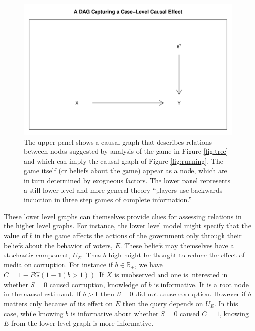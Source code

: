 \documentclass[12pt,]{book}
\begin{document}
\begin{figure}

{\centering \includegraphics[width=\textwidth]{ii_files/figure-latex/unnamed-chunk-13-1} 

}

\caption{\label{fig:gamedag} The upper panel shows a causal graph that describes  relations between nodes suggested by analysis of  the  game  in Figure \ref{fig:tree} and which can imply the causal graph of  Figure \ref{fig:running}. The game itself  (or beliefs about the game) appear as a node, which are in turn determined by exogneous factors.   The lower panel represents a still lower level and more general theory ``players use backwards induction in three step games of complete information.''}\label{fig:unnamed-chunk-13}
\end{figure}

These lower level graphs can themselves provide clues for assessing relations in the higher level graphs. For instance, the lower level model might specify that the value of \(b\) in the game affects the actions of the government only through their beliefs about the behavior of voters, \(E\). These beliefs may themselves have a stochastic component, \(U_E\). Thus \(b\) high might be thought to reduce the effect of media on corruption. For instance if \(b \in \mathbb{R}_+\), we have \(C= 1-FG(1-\mathbb{1}(b>1))\). If \(X\) is unobserved and one is interested in whether \(S=0\) caused corruption, knowledge of \(b\) is informative. It is a root node in the causal estimand. If \(b>1\) then \(S=0\) did not cause corruption. However if \(b\) matters only because of its effect on \(E\) then the query depends on \(U_E\). In this case, while knowing \(b\) is informative about whether \(S=0\) caused \(C=1\), knowing \(E\) from the lower level graph is more informative.
\end{document}

